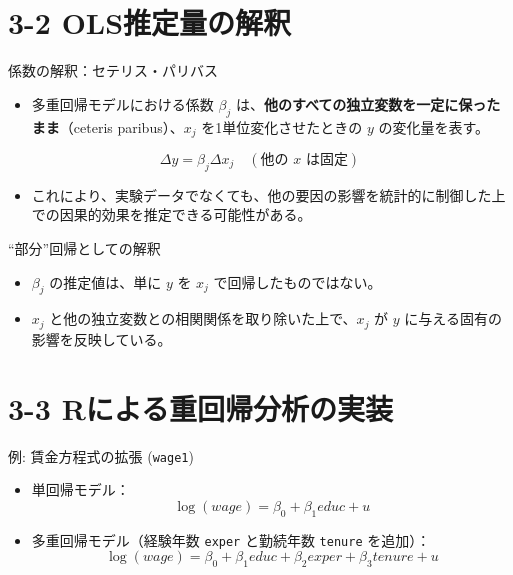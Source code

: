 \documentclass[
  ignorenonframetext,
]{beamer}
\providecommand{\tightlist}{%
  \setlength{\itemsep}{0pt}\setlength{\parskip}{0pt}}
\begin{document}
\hypertarget{olsux63a8ux5b9aux91cfux306eux89e3ux91c8}{%
\section{3-2
OLS推定量の解釈}\label{olsux63a8ux5b9aux91cfux306eux89e3ux91c8}}

\begin{frame}{係数の解釈：セテリス・パリバス}
\protect\hypertarget{ux4fc2ux6570ux306eux89e3ux91c8ux30bbux30c6ux30eaux30b9ux30d1ux30eaux30d0ux30b9}{}
\begin{itemize}
\tightlist
\item
  多重回帰モデルにおける係数 \(\beta_j\)
  は、\textbf{他のすべての独立変数を一定に保ったまま}（ceteris
  paribus）、\(x_j\) を1単位変化させたときの \(y\) の変化量を表す。
\end{itemize}

\[ \Delta y = \beta_j \Delta x_j \quad (\text{他の } x \text{ は固定}) \]

\begin{itemize}
\tightlist
\item
  これにより、実験データでなくても、他の要因の影響を統計的に制御した上での因果的効果を推定できる可能性がある。
\end{itemize}
\end{frame}

\begin{frame}{``部分''回帰としての解釈}
\protect\hypertarget{ux90e8ux5206ux56deux5e30ux3068ux3057ux3066ux306eux89e3ux91c8}{}
\begin{itemize}
\tightlist
\item
  \(\beta_j\) の推定値は、単に \(y\) を \(x_j\) で回帰したものではない。
\item
  \(x_j\) と他の独立変数との相関関係を取り除いた上で、\(x_j\) が \(y\)
  に与える固有の影響を反映している。
\end{itemize}
\end{frame}

\hypertarget{rux306bux3088ux308bux91cdux56deux5e30ux5206ux6790ux306eux5b9fux88c5}{%
\section{3-3
Rによる重回帰分析の実装}\label{rux306bux3088ux308bux91cdux56deux5e30ux5206ux6790ux306eux5b9fux88c5}}

\begin{frame}[fragile]{例: 賃金方程式の拡張 (\texttt{wage1})}
\protect\hypertarget{ux4f8b-ux8cc3ux91d1ux65b9ux7a0bux5f0fux306eux62e1ux5f35-wage1}{}
\begin{itemize}
\item
  単回帰モデル： \[ \log(wage) = \beta_0 + \beta_1 educ + u \]
\item
  多重回帰モデル（経験年数 \texttt{exper} と勤続年数 \texttt{tenure}
  を追加）：
  \[ \log(wage) = \beta_0 + \beta_1 educ + \beta_2 exper + \beta_3 tenure + u \]
\end{itemize}
\end{frame}
\end{document}
